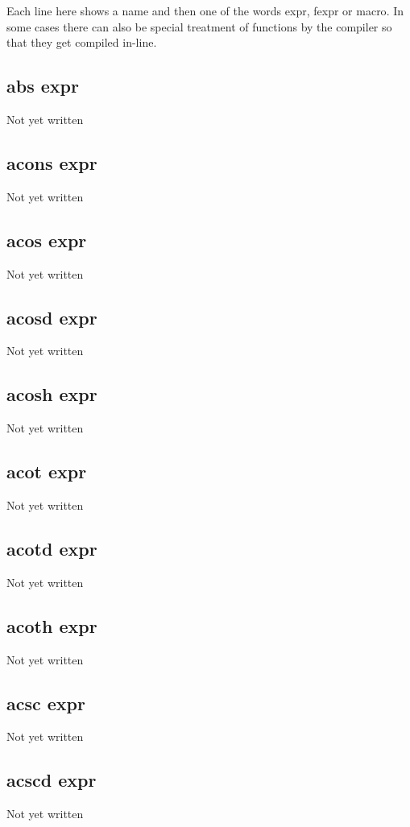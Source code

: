 \documentclass[a4paper,11pt]{article}
\begin{document}
{Each line here shows a name and then one of the words {\ttfamily expr},
{\ttfamily fexpr} or {\ttfamily macro}. In some cases there can also be special
treatment of functions by the compiler so that they get compiled in-line.
  

\subsection{\ttfamily abs expr}
Not yet written

\subsection{\ttfamily acons expr}
Not yet written

\subsection{\ttfamily acos expr}
Not yet written

\subsection{\ttfamily acosd expr}
Not yet written

\subsection{\ttfamily acosh expr}
Not yet written

\subsection{\ttfamily acot expr}
Not yet written

\subsection{\ttfamily acotd expr}
Not yet written

\subsection{\ttfamily acoth expr}
Not yet written

\subsection{\ttfamily acsc expr}
Not yet written

\subsection{\ttfamily acscd expr}
Not yet written

}
\end{document}
